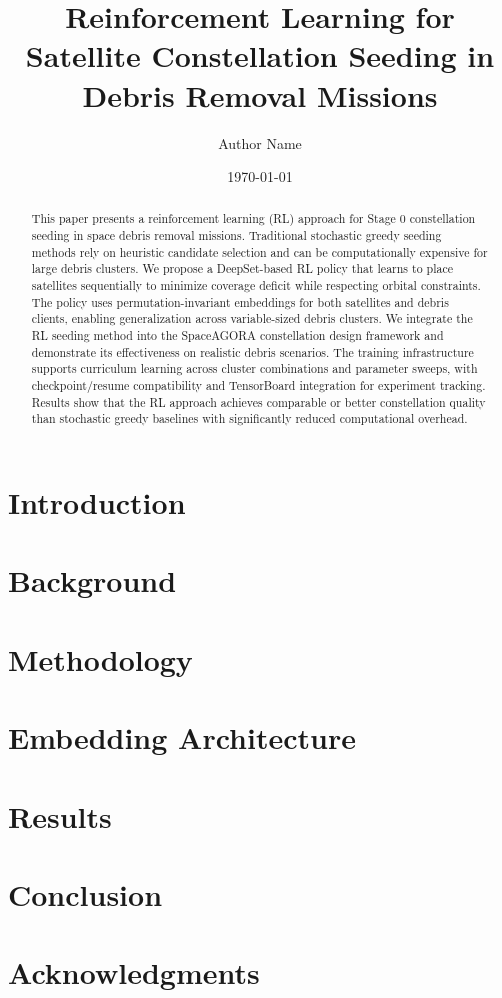 \documentclass{AIAA}
\title{Reinforcement Learning for Satellite Constellation Seeding in Debris Removal Missions}
\author{Author Name}
\affiliation{SpaceAGORA Research Group}
\date{\today}
\begin{document}
\maketitle

\begin{abstract}
This paper presents a reinforcement learning (RL) approach for Stage 0 constellation seeding in space debris removal missions. Traditional stochastic greedy seeding methods rely on heuristic candidate selection and can be computationally expensive for large debris clusters. We propose a DeepSet-based RL policy that learns to place satellites sequentially to minimize coverage deficit while respecting orbital constraints. The policy uses permutation-invariant embeddings for both satellites and debris clients, enabling generalization across variable-sized debris clusters. We integrate the RL seeding method into the SpaceAGORA constellation design framework and demonstrate its effectiveness on realistic debris scenarios. The training infrastructure supports curriculum learning across cluster combinations and parameter sweeps, with checkpoint/resume compatibility and TensorBoard integration for experiment tracking. Results show that the RL approach achieves comparable or better constellation quality than stochastic greedy baselines with significantly reduced computational overhead.
\end{abstract}

\section{Introduction}


\section{Background}


\section{Methodology}


\section{Embedding Architecture}


\section{Results}


\section{Conclusion}


\section*{Acknowledgments}




\end{document}
